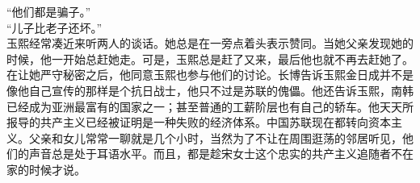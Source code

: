 \begin{multicols}{\theparacolNo}
“他们都是骗子。”\\

“儿子比老子还坏。”\\

玉熙经常凑近来听两人的谈话。她总是在一旁点着头表示赞同。当她父亲发现她的时候，他一开始总赶她走。可是，玉熙总是赶了又来，最后他也就不再去赶她了。在让她严守秘密之后，他同意玉熙也参与他们的讨论。长博告诉玉熙金日成并不是像他自己宣传的那样是个抗日战士，他只不过是苏联的傀儡。他还告诉玉熙，南韩已经成为亚洲最富有的国家之一；甚至普通的工薪阶层也有自己的轿车。他天天所报导的共产主义已经被证明是一种失败的经济体系。中国苏联现在都转向资本主义。父亲和女儿常常一聊就是几个小时，当然为了不让在周围逛荡的邻居听见，他们的声音总是处于耳语水平。而且，都是趁宋女士这个忠实的共产主义追随者不在家的时候才说。\\
\ifnum{}
	\end{multicols}
\fi